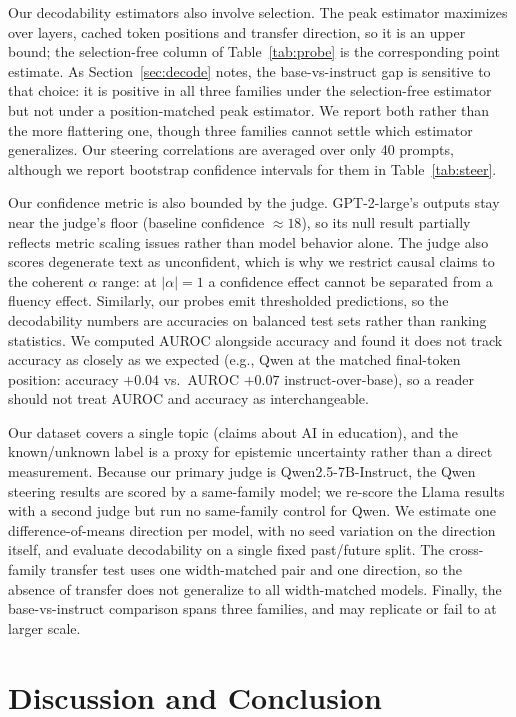 \documentclass{article}
\begin{document}
Our decodability estimators also involve selection. The peak estimator maximizes over layers, cached token positions and transfer direction, so it is an upper bound; the selection-free column of Table~\ref{tab:probe} is the corresponding point estimate. As Section~\ref{sec:decode} notes, the base-vs-instruct gap is sensitive to that choice: it is positive in all three families under the selection-free estimator but not under a position-matched peak estimator. We report both rather than the more flattering one, though three families cannot settle which estimator generalizes. Our steering correlations are averaged over only 40 prompts, although we report bootstrap confidence intervals for them in Table~\ref{tab:steer}.

Our confidence metric is also bounded by the judge. GPT-2-large's outputs stay near the judge's floor (baseline confidence $\approx 18$), so its null result partially reflects metric scaling issues rather than model behavior alone. The judge also scores degenerate text as unconfident, which is why we restrict causal claims to the coherent $\alpha$ range: at $|\alpha| = 1$ a confidence effect cannot be separated from a fluency effect. Similarly, our probes emit thresholded predictions, so the decodability numbers are accuracies on balanced test sets rather than ranking statistics. We computed AUROC alongside accuracy and found it does not track accuracy as closely as we expected (e.g., Qwen at the matched final-token position: accuracy $+0.04$ vs.\ AUROC $+0.07$ instruct-over-base), so a reader should not treat AUROC and accuracy as interchangeable.

Our dataset covers a single topic (claims about AI in education), and the known/unknown label is a proxy for epistemic uncertainty rather than a direct measurement. Because our primary judge is Qwen2.5-7B-Instruct, the Qwen steering results are scored by a same-family model; we re-score the Llama results with a second judge but run no same-family control for Qwen. We estimate one difference-of-means direction per model, with no seed variation on the direction itself, and evaluate decodability on a single fixed past/future split. The cross-family transfer test uses one width-matched pair and one direction, so the absence of transfer does not generalize to all width-matched models. Finally, the base-vs-instruct comparison spans three families, and may replicate or fail to at larger scale.

\section{Discussion and Conclusion}
\end{document}
